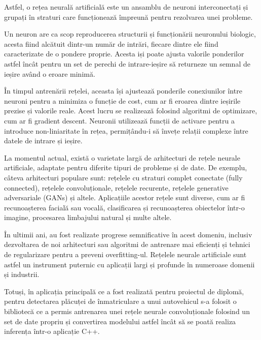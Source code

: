 \documentclass[12pt]{article}
\begin{document}
Astfel, o rețea neural\u{a} artificial\u{a} este un ansamblu de neuroni interconectați și grupați \^{i}n straturi care funcționeaz\u{a} \^{i}mpreun\u{a} pentru rezolvarea unei probleme.

Un neuron are ca scop reproducerea structurii și funcțion\u{a}rii neuronului biologic, acesta fiind alc\u{a}tuit dintr-un num\u{a}r de intr\u{a}ri, fiecare dintre ele fiind caracterizate de o pondere proprie. Acesta iși poate ajusta valorile ponderilor astfel \^{i}nc\^{a}t pentru un set de perechi de intrare-ieșire s\u{a} returneze un semnal de ieșire av\^{a}nd o eroare minim\u{a}.

\^{I}n timpul antren\u{a}rii rețelei, aceasta \^{i}și ajusteaz\u{a} ponderile conexiunilor \^{i}ntre neuroni pentru a minimiza o funcție de cost, cum ar fi eroarea dintre ieșirile prezise și valorile reale. Acest lucru se realizeaz\u{a} folosind algoritmi de optimizare, cum ar fi gradient descent. Neuronii utilizeaz\u{a} funcții de activare pentru a introduce non-liniaritate \^{i}n rețea, permiț\^{a}ndu-i s\u{a} \^{i}nvețe relații complexe \^{i}ntre datele de intrare și ieșire.

La momentul actual, exist\u{a} o varietate larg\u{a} de arhitecturi de rețele neurale artificiale, adaptate pentru diferite tipuri de probleme și de date. De exemplu, c\^{a}teva arhitecturi populare sunt: rețelele cu straturi complet conectate (fully connected), rețelele convoluționale, rețelele recurente, rețelele generative adversariale (GANs) și altele. Aplicațiile acestor rețele sunt diverse, cum ar fi recunoașterea facial\u{a} sau vocal\u{a}, clasificarea și recunoașterea obiectelor \^{i}ntr-o imagine, procesarea limbajului natural și multe altele.

\^{I}n ultimii ani, au fost realizate progrese semnificative \^{i}n acest domeniu, inclusiv dezvoltarea de noi arhitecturi sau algoritmi de antrenare mai eficienți și tehnici de regularizare pentru a preveni overfitting-ul. Rețelele neurale artificiale sunt astfel un instrument puternic cu aplicații largi și profunde \^{i}n numeroase domenii și industrii.

Totuși, \^{i}n aplicația principal\u{a} ce a fost realizat\u{a} pentru proiectul de diplom\u{a}, pentru detectarea pl\u{a}cuței de \^{i}nmatriculare a unui autovehicul s-a folosit o bibliotec\u{a} ce a permis antrenarea unei rețele neurale convoluționale folosind un set de date propriu și convertirea modelului astfel \^{i}nc\^{a}t s\u{a} se poat\u{a} realiza inferența \^{i}ntr-o aplicație C++.
\end{document}
